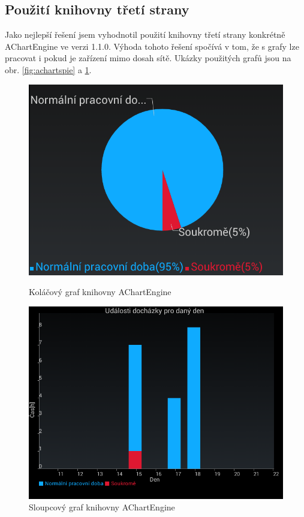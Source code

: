 \documentclass{diplomka}
\begin{document}
\subsection*{Použití knihovny třetí strany}
Jako nejlepší řešení jsem vyhodnotil použití knihovny třetí strany konkrétně AChartEngine\cite{achartengine} ve verzi 1.1.0. Výhoda tohoto řešení spočívá v tom, že s grafy lze pracovat i pokud je zařízení mimo dosah sítě. Ukázky použitých grafů jsou na obr. \ref{fig:achartspie} a  \ref{fig:achartsstack}.
\begin{figure}[H]
\centering
\begin{minipage}{.48\textwidth}
  \centering
  \includegraphics[width=1\linewidth]{obr/achartspie.png}
 \caption{Koláčový graf knihovny AChartEngine}
  \label{fig:achartspie}
\end{minipage}\hfill%
\begin{minipage}{.48\textwidth}
   \centering
 \includegraphics[width=1\linewidth]{obr/achartsstack.png}
   \caption{Sloupcový graf knihovny AChartEngine}
  \label{fig:achartsstack}
\end{minipage}
\end{figure}
\end{document}
